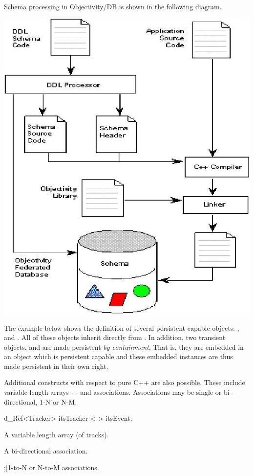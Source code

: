 \par

Schema processing in Objectivity/DB is shown in the following diagram.
\par

\includegraphics[width=.7\linewidth, scale=.5]{schema}

\par

The example below shows the definition of several persistent capable
objects: ,  and .
All of these objects inherit directly from .
In addition, two transient objects,  and 
are made persistent \emph{by containment}. That is, they are embedded
in an object which is persistent capable and these embedded instances are
thus made persistent in their own right.

\par

Additional constructs with respect to pure C++ are also
possible. These include variable length arrays -
 - and associations. Associations
may be single or bi-directional, 1-N or N-M.
\begin{DLtt}{d_Ref<Tracker> itsTracker <-> itsEvent;}
\item[d_Varray<Track> tracks]A variable length array (of tracks).
\item[d_Ref<Tracker> itsTracker <-> itsEvent;]A bi-directional association.
\item[d_Ref<Event> itsEvents[];]1-to-N or N-to-M associations.
\end{DLtt}

